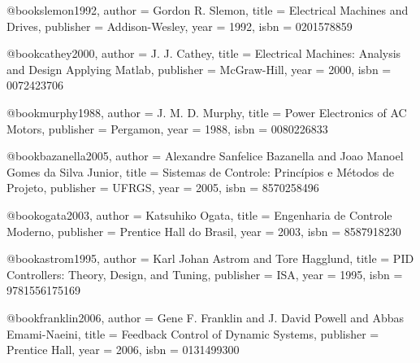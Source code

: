 @book{slemon1992,
  author = {Gordon R. Slemon},
  title = {Electrical Machines and Drives},
  publisher = {Addison-Wesley},
  year = {1992},
  isbn = {0201578859}
}

@book{cathey2000,
  author = {J. J. Cathey},
  title = {Electrical Machines: Analysis and Design Applying Matlab},
  publisher = {McGraw-Hill},
  year = {2000},
  isbn = {0072423706}
}

@book{murphy1988,
  author = {J. M. D. Murphy},
  title = {Power Electronics of AC Motors},
  publisher = {Pergamon},
  year = {1988},
  isbn = {0080226833}
}

%

@book{bazanella2005,
  author = {Alexandre Sanfelice Bazanella and Joao Manoel Gomes da Silva Junior},
  title = {Sistemas de Controle: Princípios e Métodos de Projeto},
  publisher = {UFRGS},
  year = {2005},
  isbn = {8570258496}
}

@book{ogata2003,
  author = {Katsuhiko Ogata},
  title = {Engenharia de Controle Moderno},
  publisher = {Prentice Hall do Brasil},
  year = {2003},
  isbn = {8587918230}
}

@book{astrom1995,
  author = {Karl Johan Astrom and Tore Hagglund},
  title = {PID Controllers: Theory, Design, and Tuning},
  publisher = {ISA},
  year = {1995},
  isbn = {9781556175169}
}

@book{franklin2006,
  author = {Gene F. Franklin and J. David Powell and Abbas Emami-Naeini},
  title = {Feedback Control of Dynamic Systems},
  publisher = {Prentice Hall},
  year = {2006},
  isbn = {0131499300}
}

